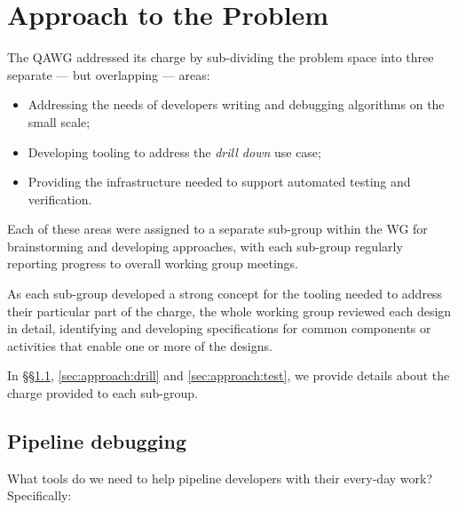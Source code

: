 \section{Approach to the Problem}
\label{sec:approach}

The QAWG addressed its charge by sub-dividing the problem space into three separate --- but overlapping --- areas:

\begin{itemize}

  \item{Addressing the needs of developers writing and debugging algorithms on the small scale;}
  \item{Developing tooling to address the \textit{\gls{drill down}} use case;}
  \item{Providing the infrastructure needed to support automated testing and verification.}

\end{itemize}

Each of these areas were assigned to a separate sub-group within the WG for
brainstorming and developing approaches, with each sub-group regularly
reporting progress to overall working group meetings.

As each sub-group developed a strong concept for the tooling needed to address
their particular part of the charge, the whole working group reviewed each
design in detail, identifying and developing specifications for common
components or activities that enable one or more of the designs.

In \S\S\ref{sec:approach:debug}, \ref{sec:approach:drill} and
\ref{sec:approach:test}, we provide details about the charge provided to each
sub-group.

\subsection{Pipeline debugging}
\label{sec:approach:debug}

What tools do we need to help pipeline developers with their every-day work?
Specifically:

